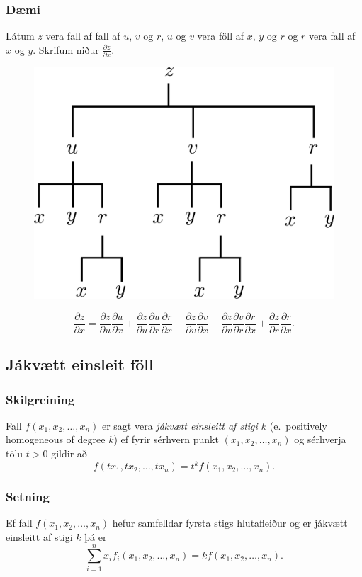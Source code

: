 \subsubsection{Dæmi }
Látum $z$ vera fall af fall af $u$, $v$ og $r$, $u$ og $v$ vera föll af $x$, $y$ og $r$ og $r$ vera fall af $x$ og $y$. Skrifum niður $\frac{\partial z}{\partial x}$.

\begin{figure}[h!]
           \centering
            \includegraphics[width=0.45\linewidth]{chain4}
    \end{figure}
$$\frac{\partial z}{\partial x} = \frac{\partial z}{\partial u} \frac{\partial u}{\partial x} +\frac{\partial z}{\partial u} \frac{\partial u}{\partial r} \frac{\partial r}{\partial x} 
+ \frac{\partial z}{\partial v} \frac{\partial v}{\partial x} + \frac{\partial z}{\partial v} \frac{\partial v}{\partial r} \frac{\partial r}{\partial x} +\frac{\partial z}{\partial r} \frac{\partial r}{\partial x}.$$




\subsection{Jákvætt einsleit föll} 

\subsubsection{Skilgreining }

Fall $f(x_1, x_2, \ldots, x_n)$ er sagt vera {\em jákvætt einsleitt af stigi $k$} (e.~positively homogeneous of degree $k$) ef fyrir sérhvern punkt $(x_1, x_2, \ldots, x_n)$ og sérhverja tölu $t>0$ gildir að 
$$f(tx_1, tx_2, \ldots, tx_n)=t^kf(x_1, x_2, \ldots, x_n).$$


\subsubsection{Setning }
 Ef fall $f(x_1, x_2, \ldots, x_n)$ hefur samfelldar fyrsta stigs hlutafleiður og er jákvætt einsleitt af stigi $k$ þá er 
$$\sum_{i=1}^n x_if_i(x_1, x_2, \ldots, x_n)=kf(x_1, x_2, \ldots, x_n).$$ 
 




